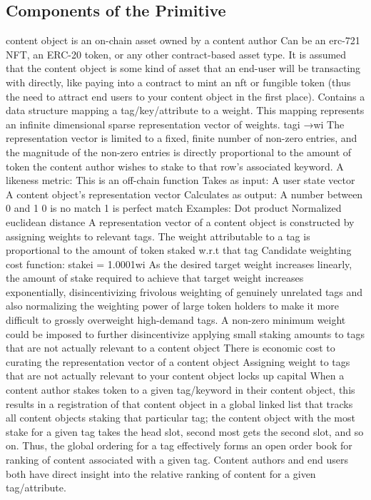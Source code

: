 \subsection{Components of the Primitive}
content object is an on-chain asset owned by a content author
Can be an erc-721 NFT, an ERC-20 token, or any other contract-based asset type. It is assumed that the content object is some kind of asset that an end-user will be transacting with directly, like paying into a contract to mint an nft or fungible token (thus the need to attract end users to your content object in the first place). 
Contains a data structure mapping a tag/key/attribute to a weight. This mapping represents an infinite dimensional sparse representation vector of weights. tagi →wi
The representation vector is limited to a fixed, finite number of non-zero entries, and the magnitude of the non-zero entries is directly proportional to the amount of token the content author wishes to stake to that row’s associated keyword.
A likeness metric:
This is an off-chain function
Takes as input:
A user state vector
A content object’s representation vector
Calculates as output:
A number between 0 and 1
0 is no match
1 is perfect match
Examples:
Dot product
Normalized euclidean distance
A representation vector of a content object is constructed by assigning weights to relevant tags. 
The weight attributable to a tag is proportional to the amount of token staked w.r.t that tag
Candidate weighting cost function: stakei = 1.0001wi  
As the desired target weight increases linearly, the amount of stake required to achieve that target weight increases exponentially, disincentivizing frivolous weighting of genuinely unrelated tags and also normalizing the weighting power of large token holders to make it more difficult to grossly overweight high-demand tags. 
A non-zero minimum weight could be imposed to further disincentivize applying small staking amounts to tags that are not actually relevant to a content object
There is economic cost to curating the representation vector of a content object
Assigning weight to tags that are not actually relevant to your content object locks up capital 
When a content author stakes token to a given tag/keyword in their content object, this results in a registration of that content object in a global linked list that tracks all content objects staking that particular tag; the content object with the most stake for a given tag takes the head slot, second most gets the second slot, and so on. 
Thus, the global ordering for a tag effectively forms an open order book for ranking of content associated with a given tag. Content authors and end users both have direct insight into the relative ranking of content for a given tag/attribute. 
